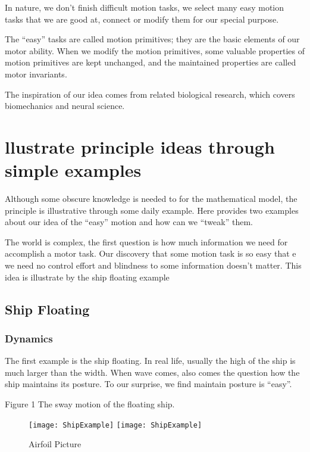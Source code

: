 In nature, we don’t finish difficult motion tasks, we select many easy motion tasks that we are good at, connect or modify them for our special purpose.

The “easy” tasks are called motion primitives; they are the basic elements of our motor ability. 
When we modify the motion primitives, some valuable properties of motion primitives are kept unchanged, and the maintained properties are called motor invariants.

The inspiration of our idea comes from related biological research, which covers biomechanics and neural science.

\section{llustrate principle ideas through simple examples}

Although some obscure knowledge is needed to for the mathematical model, the principle is illustrative through some daily example. Here provides two examples about our idea of the “easy” motion and how can we “tweak” them.

The world is complex, the first question is how much information we need for accomplish a motor task. Our discovery that some motion task is so easy that e we need no control effort and blindness to some information doesn’t matter.
This idea is illustrate by the ship floating example

\subsection{Ship Floating}


\subsubsection*{Dynamics}
The first example is the ship floating. In real life, usually the high of the ship is much larger than the width. When wave comes, also comes the question how the ship maintains its posture.
To our surprise, we find maintain posture is “easy”.

Figure 1 The sway motion of the floating ship.

\begin{figure}[!htbp]
  \begin{center}
    \leavevmode
    \ifpdf
      \texttt{[image: ShipExample]}
    \else
      \texttt{[image: ShipExample]}
    \fi
    \caption{Airfoil Picture}
    \label{ShipFloating}
  \end{center}
\end{figure}




